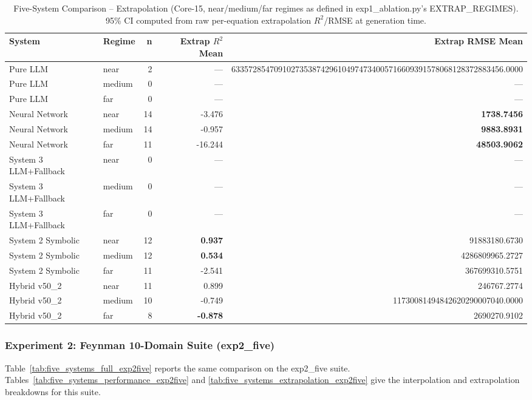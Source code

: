 \documentclass[twoside,11pt]{article}
\begin{document}
\begin{table}[t]
\centering
\caption{Five-System Comparison -- Extrapolation (Core-15, near/medium/far
  regimes as defined in exp1\_ablation.py's EXTRAP\_REGIMES).
  95\% CI computed from raw per-equation extrapolation $R^2$/RMSE at
  generation time.}
\label{tab:five_systems_extrapolation}
\begin{tabular}{llrrr}
\toprule
\textbf{System} & \textbf{Regime} & \textbf{n}
  & \textbf{Extrap $R^2$ Mean} & \textbf{Extrap RMSE Mean} \\
\midrule
Pure LLM & near & 2 & --- & 6335728547091027353874296104974734005716609391578068128372883456.0000 \\
Pure LLM & medium & 0 & --- & --- \\
Pure LLM & far & 0 & --- & --- \\
Neural Network & near & 14 & -3.476 & \textbf{1738.7456} \\
Neural Network & medium & 14 & -0.957 & \textbf{9883.8931} \\
Neural Network & far & 11 & -16.244 & \textbf{48503.9062} \\
System 3 LLM+Fallback & near & 0 & --- & --- \\
System 3 LLM+Fallback & medium & 0 & --- & --- \\
System 3 LLM+Fallback & far & 0 & --- & --- \\
System 2 Symbolic & near & 12 & \textbf{0.937} & 91883180.6730 \\
System 2 Symbolic & medium & 12 & \textbf{0.534} & 4286809965.2727 \\
System 2 Symbolic & far & 11 & -2.541 & 367699310.5751 \\
Hybrid v50\_2 & near & 11 & 0.899 & 246767.2774 \\
Hybrid v50\_2 & medium & 10 & -0.749 & 11730081494842620290007040.0000 \\
Hybrid v50\_2 & far & 8 & \textbf{-0.878} & 2690270.9102 \\
\bottomrule
\end{tabular}
\end{table}

\subsubsection{Experiment 2: Feynman 10-Domain Suite (exp2\_five)}\label{subsubsec:five-system-exp2}

Table~\ref{tab:five_systems_full_exp2five} reports the same
comparison on the exp2\_five suite. Tables~\ref{tab:five_systems_performance_exp2five}
and \ref{tab:five_systems_extrapolation_exp2five} give the interpolation and
extrapolation breakdowns for this suite.
\end{document}
